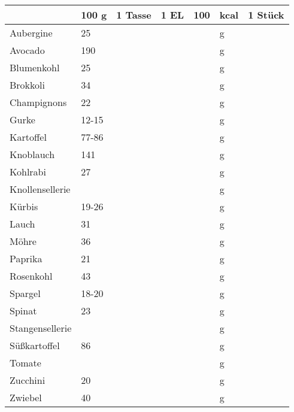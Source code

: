 \begin{tabularx}{\linewidth}{X|l|r|r|rl|r}
                  &   100 g & 1 Tasse & 1 EL &      100 & kcal    & 1 Stück  \\
\hline
Aubergine         &      25 &         &      &          & g       &          \\
Avocado           &     190 &         &      &          & g       &          \\
Blumenkohl        &      25 &         &      &          & g       &          \\
Brokkoli          &      34 &         &      &          & g       &          \\
Champignons       &      22 &         &      &          & g       &          \\
Gurke             &   12-15 &         &      &          & g       &          \\
Kartoffel         &   77-86 &         &      &          & g       &          \\
Knoblauch         &     141 &         &      &          & g       &          \\
Kohlrabi          &      27 &         &      &          & g       &          \\
Knollensellerie   &         &         &      &          & g       &          \\
Kürbis            &   19-26 &         &      &          & g       &          \\
Lauch             &      31 &         &      &          & g       &          \\
Möhre             &      36 &         &      &          & g       &          \\
Paprika           &      21 &         &      &          & g       &          \\
Rosenkohl         &      43 &         &      &          & g       &          \\
Spargel           &   18-20 &         &      &          & g       &          \\
Spinat            &      23 &         &      &          & g       &          \\
Stangensellerie   &         &         &      &          & g       &          \\
Süßkartoffel      &      86 &         &      &          & g       &          \\
Tomate            &         &         &      &          & g       &          \\
Zucchini          &      20 &         &      &          & g       &          \\
Zwiebel           &      40 &         &      &          & g       &          \\
\end{tabularx}
